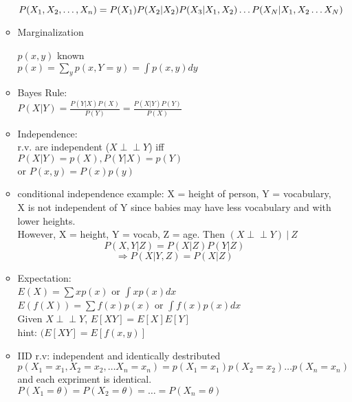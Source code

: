 \documentclass[12pt]{article}
\newcommand{\indep}{\perp \!\!\! \perp}
\begin{document}
\begin{multicols}{2}
\begin{enumerate}
\begin{itemize}
                $P(X_1, X_2, \dots, X_n) = P(X_1)P(X_2|X_2)P(X_3|X_1,X_2)\\ \dots P(X_N|X_1,X_2 \dots X_N) $

                \item Marginalization
                
                $p(x,y)$ known\\
                $p(x) = \sum\limits_y p(x, Y= y) = \int p(x,y)dy$  

                \item Bayes Rule:\\
                $P(X|Y) = \frac{P(Y|X)P(X)}{P(Y)} = \frac{P(X|Y)P(Y)}{P(X)} $

                \item Independence: \\
                r.v. are independent ($X\indep Y$) iff \\
                $P(X|Y) = p(X), P(Y|X) = p(Y)$
                \\or $P(x,y) =P(x)p(y)$
                \item conditional independence
                example: X = height of person, Y = vocabulary, X is not independent of Y since babies may have less vocabulary and with lower heights.\\
                However, X = height, Y = vocab, Z = age. Then $(X\indep Y)\ | \ Z$
                $$P(X,Y|Z) = P(X|Z)P(Y|Z)$$
                $$\Rightarrow P(X|Y, Z) = P(X|Z)$$

                \item Expectation:\\
                $E(X) = \sum xp(x) $ or $\int xp(x)dx$\\
                $E(f(X)) = \sum f(x)p(x)$ or $\int f(x)p(x)dx$\\
                Given $X\indep Y$, $E[XY] = E[X]E[Y] $ \\
                hint: $(E[XY] = E[f(x,y)]$

                \item IID r.v: independent and identically destributed\\
                $p(X_1= x_1, X_2 = x_2, \dots X_n = x_n) = p(X_1 = x_1)p(X_2 = x_2)\dots p(X_n = x_n)$ and each expriment is identical.\\ $P(X_1 = \theta) = P(X_2 = \theta) = \dots = P(X_n = \theta)$
            \end{itemize}
        \end{enumerate}


\end{multicols}
\end{document}
